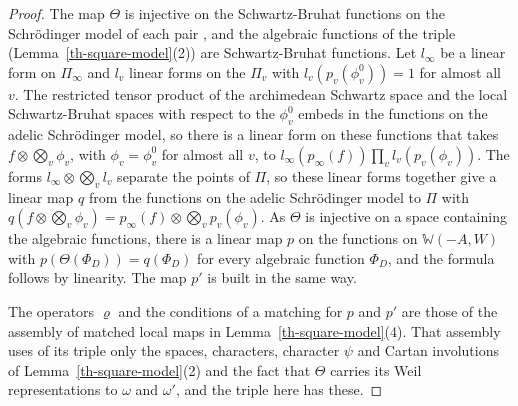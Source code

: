 \begin{proof}
The map $\Theta$ is injective on the Schwartz-Bruhat functions on the
Schrödinger model of each pair \cite{Wei64}, and the algebraic functions of the
triple (Lemma~\ref{th-square-model}(2)) are Schwartz-Bruhat functions. Let
$l_\infty$ be a linear form on $\Pi_\infty$ and $l_v$ linear forms on the
$\Pi_v$ with $l_v(p_v(\phi^0_v))=1$ for almost all $v$. The restricted tensor
product of the archimedean Schwartz space and the local Schwartz-Bruhat spaces
with respect to the $\phi^0_v$ embeds in the functions on the adelic
Schrödinger model, so there is a linear form on these functions that takes
$f\otimes\bigotimes_v\phi_v$, with $\phi_v=\phi^0_v$ for almost all $v$, to
$l_\infty(p_\infty(f))\prod_vl_v(p_v(\phi_v))$. The forms
$l_\infty\otimes\bigotimes_vl_v$ separate the points of $\Pi$, so these linear
forms together give a linear map $q$ from the functions on the adelic
Schrödinger model to $\Pi$ with
$q(f\otimes\bigotimes_v\phi_v)=p_\infty(f)\otimes\bigotimes_vp_v(\phi_v)$. As
$\Theta$ is injective on a space containing the
algebraic functions, there is a linear map $p$ on the functions on
$\mathbb W(-A,W)$ with $p(\Theta(\Phi_D))=q(\Phi_D)$ for every algebraic
function $\Phi_D$, and the formula follows by linearity. The map $p'$ is built
in the same way.

The operators $\varrho$ and the conditions of a matching for $p$ and $p'$ are
those of the assembly of matched local maps in
Lemma~\ref{th-square-model}(4). That assembly uses of its triple only the
spaces, characters, character $\psi$ and Cartan involutions of
Lemma~\ref{th-square-model}(2) and the fact that $\Theta$ carries its Weil
representations to $\omega$ and $\omega'$, and the triple here has these.
\end{proof}


